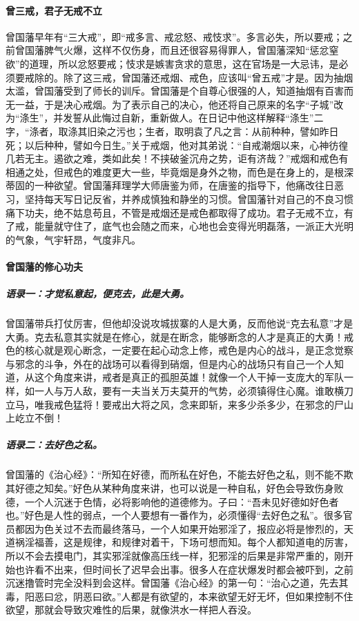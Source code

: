 \paragraph{曾三戒，君子无戒不立}

曾国藩早年有“三大戒”，即“戒多言、戒忿怒、戒忮求”。多言必失，所以要戒；之前曾国藩脾气火爆，这样不仅伤身，而且还很容易得罪人，曾国藩深知“惩忿窒欲”的道理，所以忿怒要戒；忮求是嫉害贪求的意思，这在官场是一大忌讳，是必须要戒除的。除了这三戒，曾国藩还戒烟、戒色，应该叫“曾五戒”才是。因为抽烟太滥，曾国藩受到了师长的训斥。曾国藩是个自尊心很强的人，知道抽烟有百害而无一益，于是决心戒烟。为了表示自己的决心，他还将自己原来的名字“子城”改为“涤生”，并发誓从此悔过自新，重新做人。在日记中他这样解释“涤生”二字，“涤者，取涤其旧染之污也；生者，取明袁了凡之言：从前种种，譬如昨日死；以后种种，譬如今日生。”关于戒烟，他对其弟说：“自戒潮烟以来，心神彷徨几若无主。遏欲之难，类如此矣！不挟破釜沉舟之势，讵有济哉？”戒烟和戒色有相通之处，但戒色的难度更大一些，毕竟烟是身外之物，而色是在身上的，是根深蒂固的一种欲望。曾国藩拜理学大师唐鉴为师，在唐鉴的指导下，他痛改往日恶习，坚持每天写日记反省，并养成慎独和静坐的习惯。曾国藩针对自己的不良习惯痛下功夫，绝不姑息苟且，不管是戒烟还是戒色都取得了成功。君子无戒不立，有了戒，能量就守住了，底气也会随之而来，心地也会变得光明磊落，一派正大光明的气象，气宇轩昂，气度非凡。

\paragraph{曾国藩的修心功夫}

\subparagraph{语录一：才觉私意起，便克去，此是大勇。}

曾国藩带兵打仗厉害，但他却没说攻城拔寨的人是大勇，反而他说“克去私意”才是大勇。克去私意其实就是在修心，就是在断念，能够断念的人才是真正的大勇！戒色的核心就是观心断念，一定要在起心动念上修，戒色是内心的战斗，是正念觉察与邪念的斗争，外在的战场可以看得到硝烟，但是内心的战场只有自己一个人知道，从这个角度来讲，戒者是真正的孤胆英雄！就像一个人干掉一支庞大的军队一样，如一人与万人敌，要有一夫当关万夫莫开的气势，必须镇得住心魔。谁敢横刀立马，唯我戒色猛将！要戒出大将之风，念来即斩，来多少杀多少，在邪念的尸山上屹立不倒！

\subparagraph{语录二：去好色之私。}

曾国藩的《治心经》：“所知在好德，而所私在好色，不能去好色之私，则不能不欺其好德之知矣。”好色从某种角度来讲，也可以说是一种自私，好色会导致伤身败德，一个人沉迷于色情，必将影响他的道德修为。子曰：“吾未见好德如好色者也。”好色是人性的弱点，一个人要想有一番作为，必须懂得“去好色之私”。很多官员都因为色关过不去而最终落马，一个人如果开始邪淫了，报应必将是惨烈的，天道祸淫福善，这是规律，和规律对着干，下场可想而知。每个人都知道电的厉害，所以不会去摸电门，其实邪淫就像高压线一样，犯邪淫的后果是非常严重的，刚开始也许看不出来，但时间长了迟早会出事。很多人在症状爆发时都会被吓到，之前沉迷撸管时完全没料到会这样。曾国藩《治心经》的第一句：“治心之道，先去其毒，阳恶曰忿，阴恶曰欲。”人都是有欲望的，本来欲望无好无坏，但如果控制不住欲望，那就会导致灾难性的后果，就像洪水一样把人吞没。

